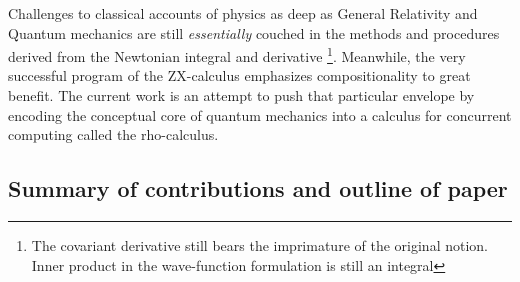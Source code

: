 Challenges to classical accounts of physics as deep as General
Relativity \cite{Gravitation} and Quantum mechanics \cite{Dirac1930}
are still \emph{essentially} couched in the methods and procedures
derived from the Newtonian integral and derivative \footnote{The
  covariant derivative still bears the imprimature of the original
  notion. Inner product in the wave-function formulation is still an
  integral}. Meanwhile, the very successful program of the ZX-calculus
emphasizes compositionality to great benefit. The current work is an
attempt to push that particular envelope by encoding the conceptual
core of quantum mechanics into a calculus for concurrent computing
called the rho-calculus.



\subsection{Summary of contributions and outline of paper}


